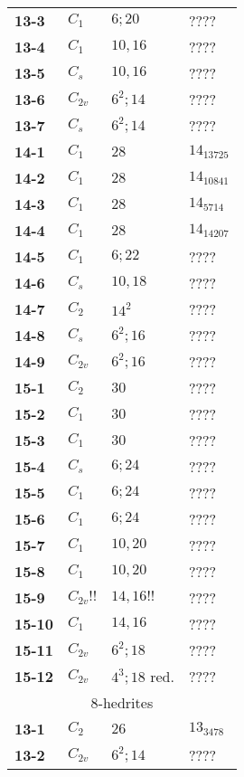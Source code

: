 \documentclass[12pt]{article}
\begin{document}
\begin{table}
\begin{center}
{\begin{minipage}{7cm}
\begin{tabular}{||l|l|l|l||}
{\bf 13-3}      &$C_1$  &$6; 20$                &????\\
{\bf 13-4}      &$C_1$  &$10, 16$               &????\\
{\bf 13-5}      &$C_s$  &$10, 16$               &????\\
{\bf 13-6}      &$C_{2v}$       &$6^2; 14$      &????\\
{\bf 13-7}      &$C_{s}$        &$6^2; 14$      &????\\\hline
{\bf 14-1}      &$C_1$  &$28$           &$14_{13725}$\\
{\bf 14-2}      &$C_1$  &$28$           &$14_{10841}$\\
{\bf 14-3}      &$C_1$  &$28$           &$14_{5714}$\\
{\bf 14-4}      &$C_1$  &$28$           &$14_{14207}$\\
{\bf 14-5}      &$C_1$  &$6; 22$                &????\\
{\bf 14-6}      &$C_s$  &$10, 18$               &????\\
{\bf 14-7}      &$C_2$  &$14^2$         &????\\
{\bf 14-8}      &$C_s$  &$6^2; 16$      &????\\
{\bf 14-9}      &$C_{2v}$       &$6^2; 16$      &????\\\hline
{\bf 15-1}      &$C_2$  &$30$   &????\\
{\bf 15-2}      &$C_1$  &$30$   &????\\
{\bf 15-3}      &$C_1$  &$30$   &????\\
{\bf 15-4}      &$C_s$  &$6;24$ &????\\
{\bf 15-5}      &$C_1$  &$6;24$ &????\\
{\bf 15-6}      &$C_1$  &$6;24$ &????\\
{\bf 15-7}      &$C_1$  &$10,20$        &????\\
{\bf 15-8}      &$C_1$  &$10,20$        &????\\
{\bf 15-9}      &$C_{2v}!!$  &$14,16!!$ &????\\
{\bf 15-10}     &$C_1$  &$14,16$        &????\\
{\bf 15-11}     &$C_{2v}$       &$6^2; 18$      &????\\
{\bf 15-12}     &$C_{2v}$       &$4^3; 18$ red. &????\\\hline
\hline
\multicolumn{4}{||c||}{$8$-hedrites}\\\hline
{\bf 13-1}      &$C_2$  &$26$           &$13_{3478}$\\
{\bf 13-2}      &$C_{2v}$       &$6^2; 14$      &????\\\hline

\end{tabular}
\end{minipage}}
\end{center}
\end{table}
\end{document}
